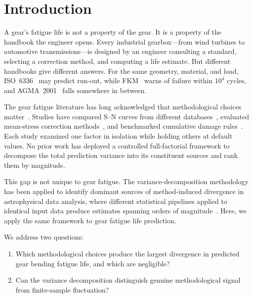 \documentclass[12pt,a4paper]{article}
\begin{document}
\section{Introduction}
\label{sec:intro}

A gear's fatigue life is not a property of the gear. It is a property
of the handbook the engineer opens. Every industrial gearbox---from wind
turbines to automotive transmissions---is designed by an engineer
consulting a standard, selecting a correction method, and computing a
life estimate. But different handbooks give different answers. For the
same geometry, material, and load, ISO~6336~\cite{iso6336} may predict
run-out, while FKM~\cite{fkm} warns of failure within $10^4$ cycles, and
AGMA~2001~\cite{agma2001} falls somewhere in between.

The gear fatigue literature has long acknowledged that methodological
choices matter~\cite{stephens2001, dowling2013}. Studies have compared
S--N curves from different databases~\cite{waterloo_fde}, evaluated mean-stress
correction methods~\cite{dowling2009}, and benchmarked cumulative damage
rules~\cite{fatemi1998}. Each study examined one factor in
isolation while holding others at default values. No prior work has
deployed a controlled full-factorial framework to decompose the total
prediction variance into its constituent sources and rank them by
magnitude.

This gap is not unique to gear fatigue. The variance-decomposition
methodology has been applied to identify dominant sources of
method-induced divergence in astrophysical data analysis, where
different statistical pipelines applied to identical input data produce
estimates spanning orders of magnitude~\cite{chen2026etaearth}. Here,
we apply the same framework to gear fatigue life prediction.

We address two questions:
\begin{enumerate}
  \item Which methodological choices produce the largest divergence in
        predicted gear bending fatigue life, and which are negligible?
  \item Can the variance decomposition distinguish genuine
        methodological signal from finite-sample fluctuation?
\end{enumerate}

\end{document}
